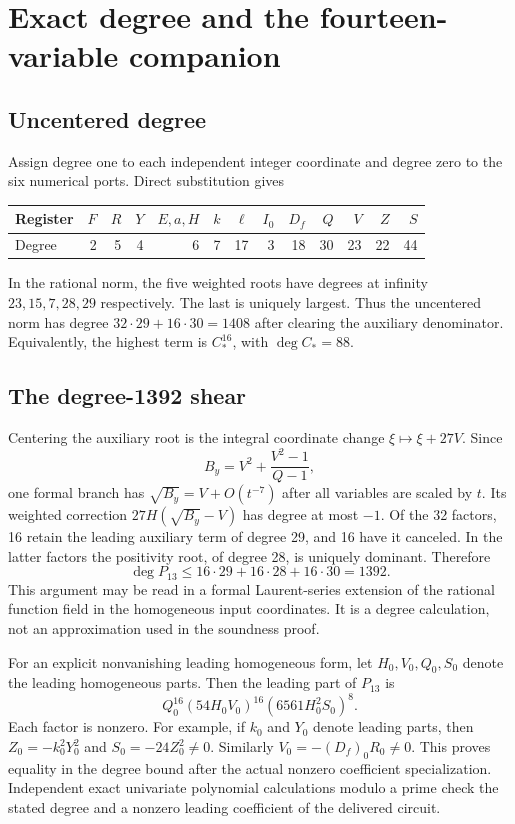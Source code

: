 \documentclass[11pt]{article}
\theoremstyle{remark}\newtheorem{remark}[theorem]{Remark}
\begin{document}
\section{Exact degree and the fourteen-variable companion}\label{sec:degree}

\subsection{Uncentered degree}
Assign degree one to each independent integer coordinate and degree zero to
the six numerical ports. Direct substitution gives
\begin{center}\small
\begin{tabular}{@{}lrrrrrrrrrrrr@{}}\toprule
Register & $F$ & $R$ & $Y$ & $E,a,H$ & $k$ & $\ell$ & $I_0$ & $D_f$ & $Q$ & $V$ & $Z$ & $S$\\\midrule
Degree &2&5&4&6&7&17&3&18&30&23&22&44\\\bottomrule
\end{tabular}
\end{center}
In the rational norm, the five weighted roots have degrees at infinity
$23,15,7,28,29$ respectively. The last is uniquely largest. Thus the
uncentered norm has degree $32\cdot29+16\cdot30=1408$ after clearing
the auxiliary denominator. Equivalently, the highest term is $C_*^{16}$,
with $\deg C_*=88$.

\subsection{The degree-1392 shear}
Centering the auxiliary root is the integral coordinate change
$\xi\mapsto\xi+27V$. Since
\[
 B_y=V^2+\frac{V^2-1}{Q-1},
\]
one formal branch has $\sqrt{B_y}=V+O(t^{-7})$ after all variables
are scaled by $t$. Its weighted correction $27H(\sqrt{B_y}-V)$ has
degree at most $-1$. Of the 32 factors, 16 retain the leading auxiliary
term of degree 29, and 16 have it canceled. In the latter factors the
positivity root, of degree 28, is uniquely dominant. Therefore
\[
 \deg P_{13}\le16\cdot29+16\cdot28+16\cdot30=1392.
\]
This argument may be read in a formal Laurent-series extension of the
rational function field in the homogeneous input coordinates. It is a
degree calculation, not an approximation used in the soundness proof.

For an explicit nonvanishing leading homogeneous form, let $H_0,V_0,Q_0,S_0$
denote the leading homogeneous parts. Then the leading part of $P_{13}$ is
\begin{equation}\label{eq:leading}
 Q_0^{16}(54H_0V_0)^{16}(6561H_0^2S_0)^8.
\end{equation}
Each factor is nonzero. For example, if $k_0$ and $Y_0$ denote leading
parts, then $Z_0=-k_0^2Y_0^2$ and $S_0=-24Z_0^2\ne0$.
Similarly $V_0=-(D_f)_0R_0\ne0$. This proves equality in the degree
bound after the actual nonzero coefficient specialization. Independent
exact univariate polynomial calculations modulo a prime check the stated
degree and a nonzero leading coefficient of the delivered circuit.
\end{document}
